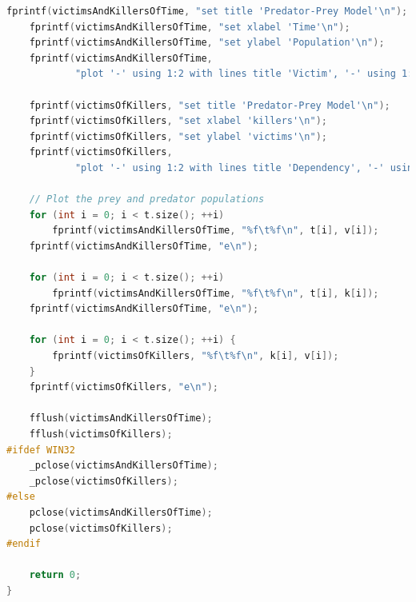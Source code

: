 \documentclass{article}
\begin{document}
\begin{lstlisting}[language=C++]
    fprintf(victimsAndKillersOfTime, "set title 'Predator-Prey Model'\n");
    fprintf(victimsAndKillersOfTime, "set xlabel 'Time'\n");
    fprintf(victimsAndKillersOfTime, "set ylabel 'Population'\n");
    fprintf(victimsAndKillersOfTime,
            "plot '-' using 1:2 with lines title 'Victim', '-' using 1:2 with lines title 'Killer'\n");

    fprintf(victimsOfKillers, "set title 'Predator-Prey Model'\n");
    fprintf(victimsOfKillers, "set xlabel 'killers'\n");
    fprintf(victimsOfKillers, "set ylabel 'victims'\n");
    fprintf(victimsOfKillers,
            "plot '-' using 1:2 with lines title 'Dependency', '-' using 1:2 with lines title 'Predator'\n");

    // Plot the prey and predator populations
    for (int i = 0; i < t.size(); ++i)
        fprintf(victimsAndKillersOfTime, "%f\t%f\n", t[i], v[i]);
    fprintf(victimsAndKillersOfTime, "e\n");

    for (int i = 0; i < t.size(); ++i)
        fprintf(victimsAndKillersOfTime, "%f\t%f\n", t[i], k[i]);
    fprintf(victimsAndKillersOfTime, "e\n");

    for (int i = 0; i < t.size(); ++i) {
        fprintf(victimsOfKillers, "%f\t%f\n", k[i], v[i]);
    }
    fprintf(victimsOfKillers, "e\n");

    fflush(victimsAndKillersOfTime);
    fflush(victimsOfKillers);
#ifdef WIN32
    _pclose(victimsAndKillersOfTime);
    _pclose(victimsOfKillers);
#else
    pclose(victimsAndKillersOfTime);
    pclose(victimsOfKillers);
#endif

    return 0;
}

\end{lstlisting}
\end{document}
